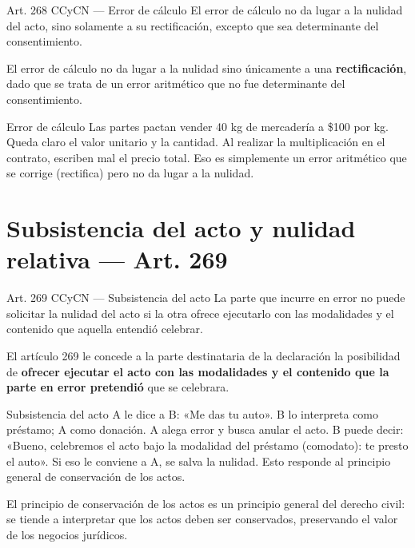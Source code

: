 \documentclass[12pt,oneside]{book}
\begin{document}
\begin{articulo}{Art. 268 CCyCN --- Error de cálculo}
El error de cálculo no da lugar a la nulidad del acto, sino solamente a su rectificación, excepto que sea determinante del consentimiento.
\end{articulo}

El error de cálculo no da lugar a la nulidad sino únicamente a una \textbf{rectificación}, dado que se trata de un error aritmético que no fue determinante del consentimiento.

\begin{example}{Error de cálculo}
Las partes pactan vender 40 kg de mercadería a \$100 por kg. Queda claro el valor unitario y la cantidad. Al realizar la multiplicación en el contrato, escriben mal el precio total. Eso es simplemente un error aritmético que se corrige (rectifica) pero no da lugar a la nulidad.
\end{example}

\section{Subsistencia del acto y nulidad relativa --- Art. 269}

\begin{articulo}{Art. 269 CCyCN --- Subsistencia del acto}
La parte que incurre en error no puede solicitar la nulidad del acto si la otra ofrece ejecutarlo con las modalidades y el contenido que aquella entendió celebrar.
\end{articulo}

El artículo 269 le concede a la parte destinataria de la declaración la posibilidad de \textbf{ofrecer ejecutar el acto con las modalidades y el contenido que la parte en error pretendió} que se celebrara.

\begin{example}{Subsistencia del acto}
A le dice a B: «Me das tu auto». B lo interpreta como préstamo; A como donación. A alega error y busca anular el acto. B puede decir: «Bueno, celebremos el acto bajo la modalidad del préstamo (comodato): te presto el auto». Si eso le conviene a A, se salva la nulidad. Esto responde al principio general de conservación de los actos.
\end{example}

\begin{important}
El principio de conservación de los actos es un principio general del derecho civil: se tiende a interpretar que los actos deben ser conservados, preservando el valor de los negocios jurídicos.
\end{important}
\end{document}
